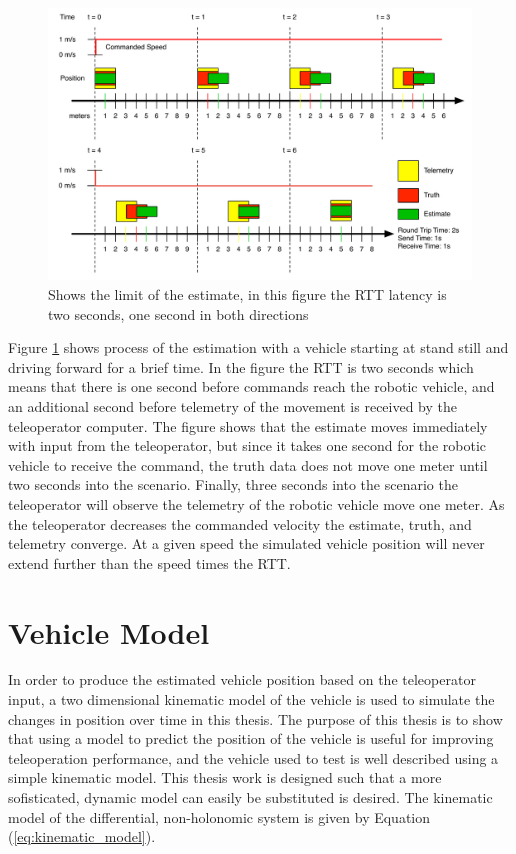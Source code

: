 \documentclass[12pt]{report}
\begin{document}
\begin{figure}[ht]
  \centering
  \includegraphics[width=6.5in,keepaspectratio]{latency_reduction_timing.pdf}
  \caption{Shows the limit of the estimate, in this figure the RTT latency is two seconds, one second in both directions}
  \label{fig:latency_reduction_timing}
\end{figure}

Figure \ref{fig:latency_reduction_timing} shows process of the estimation with a vehicle starting at stand still and driving forward for a brief time.  In the figure the RTT is two seconds which means that there is one second before commands reach the robotic vehicle, and an additional second before telemetry of the movement is received by the teleoperator computer.  The figure shows that the estimate moves immediately with input from the teleoperator, but since it takes one second for the robotic vehicle to receive the command, the truth data does not move one meter until two seconds into the scenario.  Finally, three seconds into the scenario the teleoperator will observe the telemetry of the robotic vehicle move one meter.  As the teleoperator decreases the commanded velocity the estimate, truth, and telemetry converge.  At a given speed the simulated vehicle position will never extend further than the speed times the RTT.

\section{Vehicle Model}
In order to produce the estimated vehicle position based on the teleoperator input, a two dimensional kinematic model of the vehicle is used to simulate the changes in position over time in this thesis.  The purpose of this thesis is to show that using a model to predict the position of the vehicle is useful for improving teleoperation performance, and the vehicle used to test is well described using a simple kinematic model.  This thesis work is designed such that a more sofisticated, dynamic model can easily be substituted is desired.  The kinematic model of the differential, non-holonomic system is given by Equation (\ref{eq:kinematic_model}).
\end{document}
